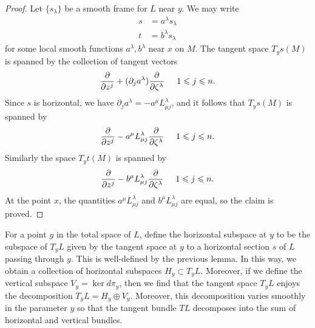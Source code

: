\documentclass{article}
\numberwithin{equation}{section}
\theoremstyle{definition}
\theoremstyle{theorem}
\begin{document}
\begin{proof}
Let $\{s_\lambda\}$ be a smooth frame for $L$ near $y$. We may write 
\begin{align*}
s &= a^\lambda s_\lambda \\
t &= b^\lambda s_\lambda
\end{align*} 
for some local smooth functions $a^\lambda, b^\lambda$ near $x$ on $M$. 
The tangent space $T_ys(M)$ is spanned by the collection of tangent vectors 
\[
\frac{\partial}{\partial z^j} + (\partial_j a^\lambda) \frac{\partial}{\partial \zeta^\lambda} \hspace{5mm} 1 \leqslant j \leqslant n.
\]
Since $s$ is horizontal, we have $\partial_j a^\lambda = -a^\mu L^\lambda_{\mu j}$, and it follows that $T_ys(M)$ is spanned by 
\[
\frac{\partial}{\partial z^j} - a^\mu L^\lambda_{\mu j} \frac{\partial}{\partial \zeta^\lambda} \hspace{5mm} 1 \leqslant j \leqslant n.
\]
Similarly the space $T_yt(M)$ is spanned by 
\[
\frac{\partial}{\partial z^j} - b^\mu L^\lambda_{\mu j} \frac{\partial}{\partial \zeta^\lambda} \hspace{5mm} 1 \leqslant j \leqslant n.
\]
At the point $x$, the quantities $a^\mu L^\lambda_{\mu j}$ and $b^\mu L^\lambda_{\mu j}$ are equal, so the claim is proved. 
\end{proof}

For a point $y$ in the total space of $L$, define the horizontal subspace at $y$ to be the subspace of $T_yL$ given by the tangent space at $y$ to a horizontal section $s$ of $L$ passing through $y$. This is well-defined by the previous lemma. In this way, we obtain a collection of horizontal subspaces $H_y \subset T_yL$. Moreover, if we define the vertical subspace $V_y = \ker d\pi_y$, then we find that the tangent space $T_yL$ enjoys the decomposition $T_yL = H_y \oplus V_y$. Moreover, this decomposition varies smoothly in the parameter $y$ so that the tangent bundle $TL$ decomposes into the sum of horizontal and vertical bundles.  
\end{document}

